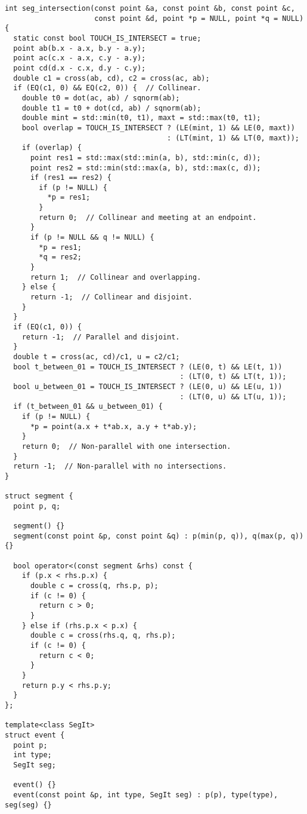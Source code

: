 \begin{lstlisting}
int seg_intersection(const point &a, const point &b, const point &c,
                     const point &d, point *p = NULL, point *q = NULL) {
  static const bool TOUCH_IS_INTERSECT = true;
  point ab(b.x - a.x, b.y - a.y);
  point ac(c.x - a.x, c.y - a.y);
  point cd(d.x - c.x, d.y - c.y);
  double c1 = cross(ab, cd), c2 = cross(ac, ab);
  if (EQ(c1, 0) && EQ(c2, 0)) {  // Collinear.
    double t0 = dot(ac, ab) / sqnorm(ab);
    double t1 = t0 + dot(cd, ab) / sqnorm(ab);
    double mint = std::min(t0, t1), maxt = std::max(t0, t1);
    bool overlap = TOUCH_IS_INTERSECT ? (LE(mint, 1) && LE(0, maxt))
                                      : (LT(mint, 1) && LT(0, maxt));
    if (overlap) {
      point res1 = std::max(std::min(a, b), std::min(c, d));
      point res2 = std::min(std::max(a, b), std::max(c, d));
      if (res1 == res2) {
        if (p != NULL) {
          *p = res1;
        }
        return 0;  // Collinear and meeting at an endpoint.
      }
      if (p != NULL && q != NULL) {
        *p = res1;
        *q = res2;
      }
      return 1;  // Collinear and overlapping.
    } else {
      return -1;  // Collinear and disjoint.
    }
  }
  if (EQ(c1, 0)) {
    return -1;  // Parallel and disjoint.
  }
  double t = cross(ac, cd)/c1, u = c2/c1;
  bool t_between_01 = TOUCH_IS_INTERSECT ? (LE(0, t) && LE(t, 1))
                                         : (LT(0, t) && LT(t, 1));
  bool u_between_01 = TOUCH_IS_INTERSECT ? (LE(0, u) && LE(u, 1))
                                         : (LT(0, u) && LT(u, 1));
  if (t_between_01 && u_between_01) {
    if (p != NULL) {
      *p = point(a.x + t*ab.x, a.y + t*ab.y);
    }
    return 0;  // Non-parallel with one intersection.
  }
  return -1;  // Non-parallel with no intersections.
}

struct segment {
  point p, q;

  segment() {}
  segment(const point &p, const point &q) : p(min(p, q)), q(max(p, q)) {}

  bool operator<(const segment &rhs) const {
    if (p.x < rhs.p.x) {
      double c = cross(q, rhs.p, p);
      if (c != 0) {
        return c > 0;
      }
    } else if (rhs.p.x < p.x) {
      double c = cross(rhs.q, q, rhs.p);
      if (c != 0) {
        return c < 0;
      }
    }
    return p.y < rhs.p.y;
  }
};

template<class SegIt>
struct event {
  point p;
  int type;
  SegIt seg;

  event() {}
  event(const point &p, int type, SegIt seg) : p(p), type(type), seg(seg) {}


\end{lstlisting}
